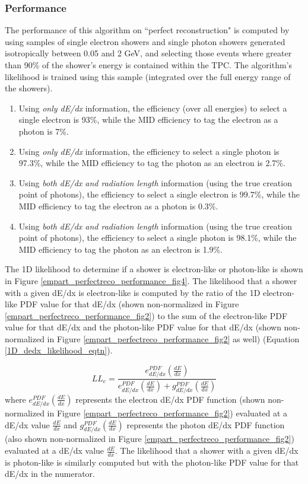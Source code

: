 \subsubsection{Performance}\label{empart_perfectreco_performance}
The performance of this algorithm on ``perfect reconstruction" is computed by using samples of single electron showers and single photon showers generated isotropically between 0.05 and 2 GeV, and selecting those events where greater than 90\% of the shower's energy is contained within the TPC. The algorithm's likelihood is trained using this sample (integrated over the full energy range of the showers). 
\begin{enumerate}
\item Using \textit{only dE/dx} information, the efficiency (over all energies) to select a single electron is 93\%, while the MID efficiency to tag the electron as a photon is 7\%. 
\item Using \textit{only dE/dx} information, the efficiency to select a single photon is 97.3\%, while the MID efficiency to tag the photon as an electron is 2.7\%.
\item Using \textit{both dE/dx and radiation length} information (using the true creation point of photons), the efficiency to select a single electron is 99.7\%, while the MID efficiency to tag the electron as a photon is 0.3\%. 
\item Using \textit{both dE/dx and radiation length} information (using the true creation point of photons), the efficiency to select a single photon is 98.1\%, while the MID efficiency to tag the photon as an electron is 1.9\%.
\end{enumerate}


The 1D likelihood to determine if a shower is electron-like or photon-like is shown in Figure \ref{empart_perfectreco_performance_fig4}. The likelihood that a shower with a given dE/dx is electron-like is computed by the ratio of the 1D electron-like PDF value for that dE/dx (shown non-normalized in Figure \ref{empart_perfectreco_performance_fig2}) to the sum of the electron-like PDF value for that dE/dx and the photon-like PDF value for that dE/dx (shown non-normalized in Figure \ref{empart_perfectreco_performance_fig2} as well) (Equation \ref{1D_dedx_likelihood_eqtn}). 

\begin{equation}\label{1D_dedx_likelihood_eqtn}
LL_e=\frac{e_{dE/dx}^{PDF}(\frac{dE}{dx})}{ e_{dE/dx}^{PDF}(\frac{dE}{dx}) + g_{dE/dx}^{PDF}(\frac{dE}{dx}) }
\end{equation}
where $e_{dE/dx}^{PDF}(\frac{dE}{dx})$ represents the electron dE/dx PDF function (shown non-normalized in Figure \ref{empart_perfectreco_performance_fig2}) evaluated at a dE/dx value $\frac{dE}{dx}$ and $g_{dE/dx}^{PDF}(\frac{dE}{dx})$ represents the photon dE/dx PDF function (also shown non-normalized in Figure \ref{empart_perfectreco_performance_fig2}) evaluated at a dE/dx value $\frac{dE}{dx}$. The likelihood that a shower with a given dE/dx is photon-like is similarly computed but with the photon-like PDF value for that dE/dx in the numerator.\\

